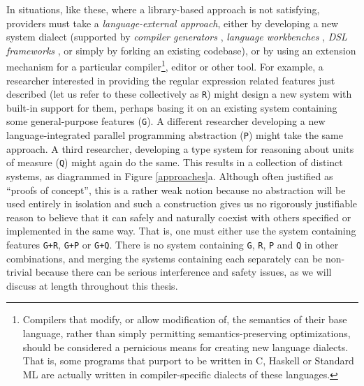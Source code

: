 In situations, like these, where a library-based approach is not satisfying, providers must take a \emph{language-external approach}, either by developing a new system dialect (supported by \emph{compiler generators} \cite{brooker1963compiler}, \emph{language workbenches} \cite{erdweg2013state}, \emph{DSL frameworks} \cite{fowler2010domain}, or simply by forking an existing codebase), or by using an extension mechanism for a {particular} compiler\footnote{Compilers that modify, or allow modification of, the semantics of their base language, rather than simply permitting semantics-preserving optimizations, should be considered a pernicious means for creating new language dialects. That is, some programs that purport to be written in C, Haskell or Standard ML are actually written in compiler-specific dialects of these languages.}, editor or other tool. For example, a researcher interested in providing the regular expression related features just described (let us refer to these collectively as \texttt{R}) might design a new system with built-in support for them, perhaps basing it on an existing system containing some general-purpose features (\texttt{G}). A different researcher developing a new language-integrated parallel programming abstraction (\texttt{P}) might  take the same approach. A third researcher, developing a type system for reasoning about units of measure (\texttt{Q}) might again do the same. This results in a collection of distinct systems, as diagrammed in Figure \ref{approaches}a. Although often justified as ``proofs of concept'', this is a rather weak notion because no abstraction will be used entirely in isolation and such a construction gives us no rigorously justifiable  reason to believe that it can safely and naturally coexist with others specified or implemented in the same way. That is, one must either use the system containing features \texttt{G+R}, \texttt{G+P} or \texttt{G+Q}. There is no system containing \texttt{G}, \texttt{R}, \texttt{P} and \texttt{Q} in other combinations, and merging the systems containing each separately can be non-trivial because there can be serious interference and safety issues, as we will discuss at length throughout this thesis.

